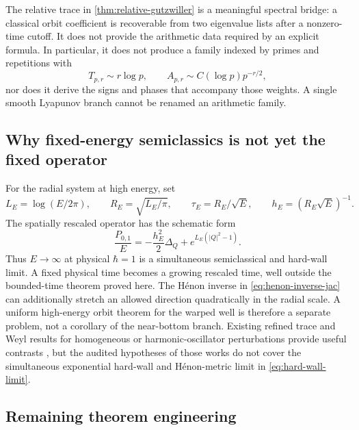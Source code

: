 The relative trace in \cref{thm:relative-gutzwiller} is a meaningful
spectral bridge: a classical orbit coefficient is recoverable from two
eigenvalue lists after a nonzero-time cutoff.  It does not provide the
arithmetic data required by an explicit formula.  In particular, it does
not produce a family indexed by primes and repetitions with
\begin{equation}
 T_{p,r}\sim r\log p,
 \qquad
 A_{p,r}\sim C(\log p)p^{-r/2},
 \label{eq:prime-target}
\end{equation}
nor does it derive the signs and phases that accompany those weights.  A
single smooth Lyapunov branch cannot be renamed an arithmetic family.

\subsection{Why fixed-energy semiclassics is not yet the fixed operator}

For the radial system at high energy, set
\begin{equation}
 L_E=\log(E/2\pi),
 \qquad
 R_E=\sqrt{L_E/\pi},
 \qquad
 \tau_E=R_E/\sqrt E,
 \qquad
 h_E=(R_E\sqrt E)^{-1}.
 \label{eq:high-energy-scales}
\end{equation}
The spatially rescaled operator has the schematic form
\begin{equation}
 \frac{P_{0,1}}{E}
 =-\frac{h_E^2}{2}\Delta_Q
 +e^{L_E(|Q|^2-1)}.
 \label{eq:hard-wall-limit}
\end{equation}
Thus \(E\to\infty\) at physical \(\hbar=1\) is a simultaneous semiclassical
and hard-wall limit.  A fixed physical time becomes a growing rescaled time,
well outside the bounded-time theorem proved here.  The H\'enon inverse in
\cref{eq:henon-inverse-jac} can additionally stretch an allowed direction
quadratically in the radial scale.  A uniform high-energy orbit theorem for
the warped well is therefore a separate problem, not a corollary of the
near-bottom branch.  Existing refined trace and Weyl results for homogeneous
or harmonic-oscillator perturbations provide useful contrasts
\citep{PushnitskiSorrell2006,DollGannotWunsch2018,DollZelditch2020}, but the
audited hypotheses of those works do not cover the simultaneous exponential
hard-wall and H\'enon-metric limit in \cref{eq:hard-wall-limit}.

\subsection{Remaining theorem engineering}

